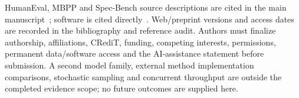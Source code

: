HumanEval, MBPP and Spec-Bench source descriptions are cited in the main manuscript~\cite{humaneval,mbpp,specbench}; software is cited directly~\cite{llamacpp,qwen3}. Web/preprint versions and access dates are recorded in the bibliography and reference audit. Authors must finalize authorship, affiliations, CRediT, funding, competing interests, permissions, permanent data/software access and the AI-assistance statement before submission. A second model family, external method implementation comparisons, stochastic sampling and concurrent throughput are outside the completed evidence scope; no future outcomes are supplied here.
